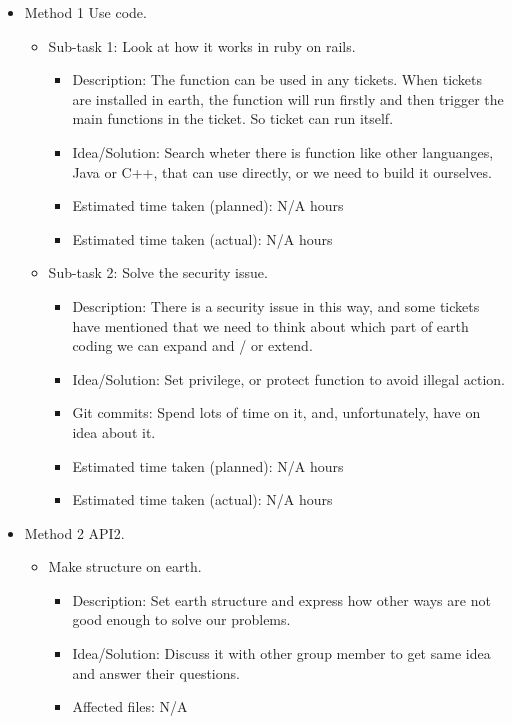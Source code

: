 \begin{itemize}
	\item Method 1 Use code.
	     \begin{itemize}
	        \item Sub-task 1: Look at how it works in ruby on rails.
	           \begin{itemize}
					\item Description: The function can be used in any tickets. When tickets are installed in earth, the function will run firstly and then trigger the main functions in the ticket. So ticket can run itself.
					\item Idea/Solution: Search wheter there is function like other languanges, Java or C++, that can use directly, or we need to build it ourselves. 
					\item Estimated time taken (planned): N/A hours
					\item Estimated time taken (actual): N/A hours
				\end{itemize}
			\item Sub-task 2: Solve the security issue.
			   \begin{itemize}
					\item Description: There is a security issue in this way, and some tickets have mentioned that we need to think about which part of earth coding we can expand and / or extend. 
					\item Idea/Solution: Set privilege, or protect function to avoid illegal action.
					\item Git commits: Spend lots of time on it, and, unfortunately, have on idea about it.
					\item Estimated time taken (planned): N/A hours
					\item Estimated time taken (actual): N/A hours
				\end{itemize}
	     \end{itemize}
	\item Method 2 API2.
	     \begin{itemize}
	         \item Make structure on earth.
	            \begin{itemize}
	              \item Description: Set earth structure and express how other ways are not good enough to solve our problems. 
					\item Idea/Solution: Discuss it with other group member to get same idea and answer their questions.
					\item Affected files: N/A

\end{itemize}
\end{itemize}
\end{itemize}

